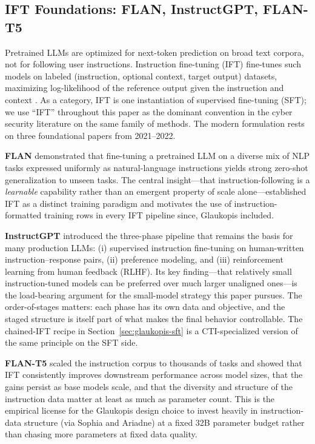 \documentclass[webpdf,contemporary,large]{oup-authoring-template}
\theoremstyle{thmstyleone}
\theoremstyle{thmstyletwo}
\theoremstyle{thmstylethree}
\begin{document}
\subsection{IFT Foundations: FLAN, InstructGPT, FLAN-T5}
\label{sec:ift-foundations}

Pretrained LLMs are optimized for next-token prediction on broad text corpora, not for following user instructions. Instruction fine-tuning (IFT) fine-tunes such models on labeled (instruction, optional context, target output) datasets, maximizing log-likelihood of the reference output given the instruction and context \cite{wei2022flan,ouyang2022instructgpt}. As a category, IFT is one instantiation of supervised fine-tuning (SFT); we use ``IFT'' throughout this paper as the dominant convention in the cyber security literature on the same family of methods. The modern formulation rests on three foundational papers from 2021--2022.

\textbf{FLAN} \cite{wei2022flan} demonstrated that fine-tuning a pretrained LLM on a diverse mix of NLP tasks expressed uniformly as natural-language instructions yields strong zero-shot generalization to unseen tasks. The central insight---that instruction-following is a \emph{learnable} capability rather than an emergent property of scale alone---established IFT as a distinct training paradigm and motivates the use of instruction-formatted training rows in every IFT pipeline since, Glaukopis included.

\textbf{InstructGPT} \cite{ouyang2022instructgpt} introduced the three-phase pipeline that remains the basis for many production LLMs: (i) supervised instruction fine-tuning on human-written instruction--response pairs, (ii) preference modeling, and (iii) reinforcement learning from human feedback (RLHF). Its key finding---that relatively small instruction-tuned models can be preferred over much larger unaligned ones---is the load-bearing argument for the small-model strategy this paper pursues. The order-of-stages matters: each phase has its own data and objective, and the staged structure is itself part of what makes the final behavior controllable. The chained-IFT recipe in Section~\ref{sec:glaukopis-sft} is a CTI-specialized version of the same principle on the SFT side.

\textbf{FLAN-T5} \cite{chung2022flant5} scaled the instruction corpus to thousands of tasks and showed that IFT consistently improves downstream performance across model sizes, that the gains persist as base models scale, and that the diversity and structure of the instruction data matter at least as much as parameter count. This is the empirical license for the Glaukopis design choice to invest heavily in instruction-data structure (via Sophia and Ariadne) at a fixed 32B parameter budget rather than chasing more parameters at fixed data quality.
\end{document}
